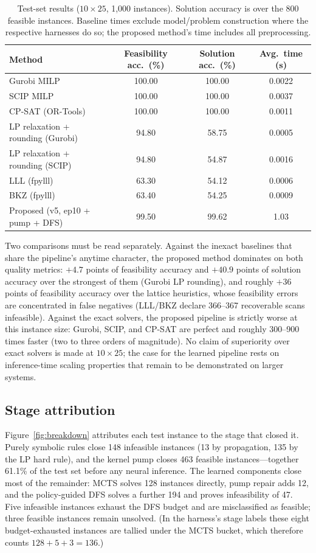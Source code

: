 \documentclass[12pt]{article}
\begin{document}
\begin{table}[t]
\centering
\caption{Test-set results ($10 \times 25$, 1{,}000 instances). Solution accuracy is over the 800 feasible instances. Baseline times exclude model/problem construction where the respective harnesses do so; the proposed method's time includes all preprocessing.}
\label{tab:main}
\begin{tabular}{lccc}
\toprule
Method & Feasibility acc.\ (\%) & Solution acc.\ (\%) & Avg.\ time (s) \\
\midrule
Gurobi MILP & 100.00 & 100.00 & 0.0022 \\
SCIP MILP & 100.00 & 100.00 & 0.0037 \\
CP-SAT (OR-Tools) & 100.00 & 100.00 & 0.0011 \\
LP relaxation + rounding (Gurobi) & 94.80 & 58.75 & 0.0005 \\
LP relaxation + rounding (SCIP) & 94.80 & 54.87 & 0.0016 \\
LLL (fpylll) & 63.30 & 54.12 & 0.0006 \\
BKZ (fpylll) & 63.40 & 54.25 & 0.0009 \\
\midrule
Proposed (v5, ep10 + pump + DFS) & 99.50 & 99.62 & 1.03 \\
\bottomrule
\end{tabular}
\end{table}

Two comparisons must be read separately. Against the inexact baselines that share the pipeline's anytime character, the proposed method dominates on both quality metrics: $+4.7$ points of feasibility accuracy and $+40.9$ points of solution accuracy over the strongest of them (Gurobi LP rounding), and roughly $+36$ points of feasibility accuracy over the lattice heuristics, whose feasibility errors are concentrated in false negatives (LLL/BKZ declare 366--367 recoverable scans infeasible). Against the exact solvers, the proposed pipeline is strictly worse at this instance size: Gurobi, SCIP, and CP-SAT are perfect and roughly 300--900 times faster (two to three orders of magnitude). No claim of superiority over exact solvers is made at $10 \times 25$; the case for the learned pipeline rests on inference-time scaling properties that remain to be demonstrated on larger systems.

\subsection{Stage attribution}

Figure~\ref{fig:breakdown} attributes each test instance to the stage that closed it. Purely symbolic rules close 148 infeasible instances (13 by propagation, 135 by the LP hard rule), and the kernel pump closes 463 feasible instances---together 61.1\% of the test set before any neural inference. The learned components close most of the remainder: MCTS solves 128 instances directly, pump repair adds 12, and the policy-guided DFS solves a further 194 and proves infeasibility of 47. Five infeasible instances exhaust the DFS budget and are misclassified as feasible; three feasible instances remain unsolved. (In the harness's stage labels these eight budget-exhausted instances are tallied under the MCTS bucket, which therefore counts $128 + 5 + 3 = 136$.)
\end{document}
